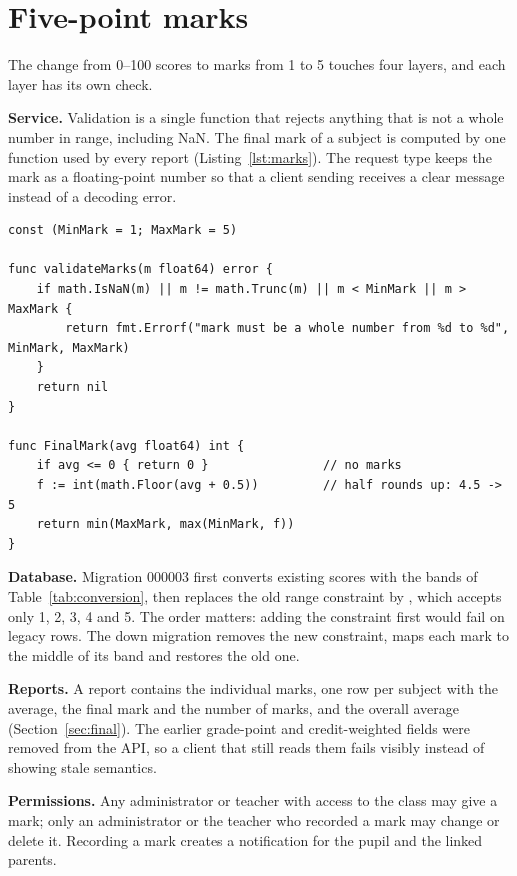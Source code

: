 \section{Five-point marks}
\label{sec:fivepoint}

The change from 0--100 scores to marks from 1 to 5 touches four layers, and each layer has its own check.

\textbf{Service.} Validation is a single function that rejects anything that is not a whole number in range, including NaN. The final mark of a subject is computed by one function used by every report (Listing~\ref{lst:marks}). The request type keeps the mark as a floating-point number so that a client sending  receives a clear message instead of a decoding error.

\begin{lstlisting}[caption={Validation and final mark (simplified from \code{grade\_service.go})},label={lst:marks},float=htbp]
const (MinMark = 1; MaxMark = 5)

func validateMarks(m float64) error {
    if math.IsNaN(m) || m != math.Trunc(m) || m < MinMark || m > MaxMark {
        return fmt.Errorf("mark must be a whole number from %d to %d", MinMark, MaxMark)
    }
    return nil
}

func FinalMark(avg float64) int {
    if avg <= 0 { return 0 }                // no marks
    f := int(math.Floor(avg + 0.5))         // half rounds up: 4.5 -> 5
    return min(MaxMark, max(MinMark, f))
}
\end{lstlisting}

\textbf{Database.} Migration 000003 first converts existing scores with the bands of Table~\ref{tab:conversion}, then replaces the old range constraint by , which accepts only 1, 2, 3, 4 and 5. The order matters: adding the constraint first would fail on legacy rows. The down migration removes the new constraint, maps each mark to the middle of its band and restores the old one.

\textbf{Reports.} A report contains the individual marks, one row per subject with the average, the final mark and the number of marks, and the overall average (Section~\ref{sec:final}). The earlier grade-point and credit-weighted fields were removed from the API, so a client that still reads them fails visibly instead of showing stale semantics.

\textbf{Permissions.} Any administrator or teacher with access to the class may give a mark; only an administrator or the teacher who recorded a mark may change or delete it. Recording a mark creates a notification for the pupil and the linked parents.

